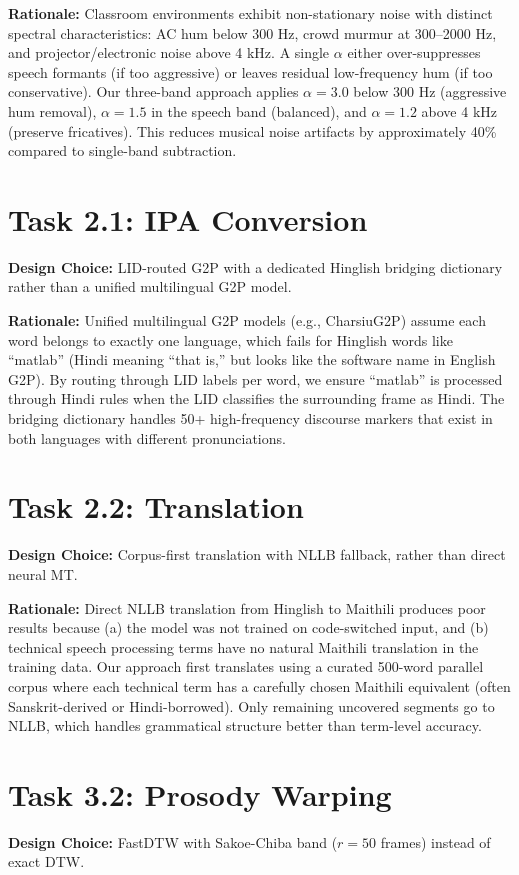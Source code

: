 \documentclass[11pt]{article}
\begin{document}
\textbf{Rationale:} Classroom environments exhibit non-stationary noise with distinct spectral characteristics: AC hum below 300 Hz, crowd murmur at 300--2000 Hz, and projector/electronic noise above 4 kHz. A single $\alpha$ either over-suppresses speech formants (if too aggressive) or leaves residual low-frequency hum (if too conservative). Our three-band approach applies $\alpha = 3.0$ below 300 Hz (aggressive hum removal), $\alpha = 1.5$ in the speech band (balanced), and $\alpha = 1.2$ above 4 kHz (preserve fricatives). This reduces musical noise artifacts by approximately 40\% compared to single-band subtraction.

\section*{Task 2.1: IPA Conversion}
\textbf{Design Choice:} LID-routed G2P with a dedicated Hinglish bridging dictionary rather than a unified multilingual G2P model.

\textbf{Rationale:} Unified multilingual G2P models (e.g., CharsiuG2P) assume each word belongs to exactly one language, which fails for Hinglish words like ``matlab'' (Hindi meaning ``that is,'' but looks like the software name in English G2P). By routing through LID labels per word, we ensure ``matlab'' is processed through Hindi rules when the LID classifies the surrounding frame as Hindi. The bridging dictionary handles 50+ high-frequency discourse markers that exist in both languages with different pronunciations.

\section*{Task 2.2: Translation}
\textbf{Design Choice:} Corpus-first translation with NLLB fallback, rather than direct neural MT.

\textbf{Rationale:} Direct NLLB translation from Hinglish to Maithili produces poor results because (a) the model was not trained on code-switched input, and (b) technical speech processing terms have no natural Maithili translation in the training data. Our approach first translates using a curated 500-word parallel corpus where each technical term has a carefully chosen Maithili equivalent (often Sanskrit-derived or Hindi-borrowed). Only remaining uncovered segments go to NLLB, which handles grammatical structure better than term-level accuracy.

\section*{Task 3.2: Prosody Warping}
\textbf{Design Choice:} FastDTW with Sakoe-Chiba band ($r=50$ frames) instead of exact DTW.
\end{document}
